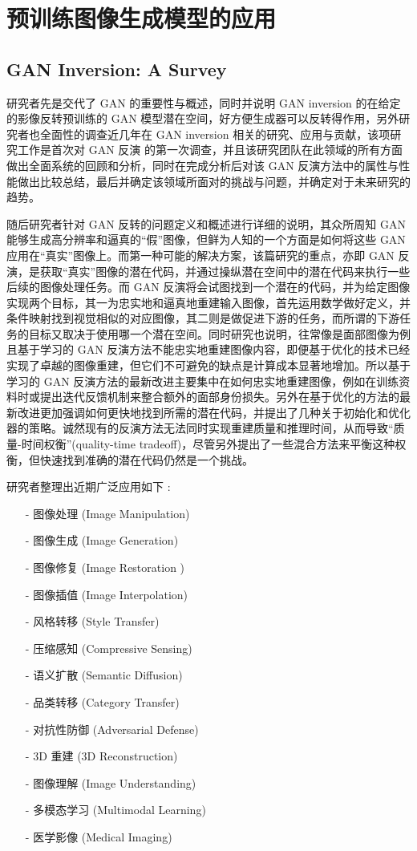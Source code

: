 \section{预训练图像生成模型的应用}

\subsection{GAN Inversion: A Survey}

研究者先是交代了 GAN 的重要性与概述，同时并说明 GAN inversion 的在给定的影像反转预训练的 GAN 模型潜在空间，好方便生成器可以反转得作用，另外研究者也全面性的调查近几年在  GAN inversion  相关的研究、应用与贡献，该项研究工作是首次对 GAN 反演 的第一次调查，并且该研究团队在此领域的所有方面做出全面系统的回顾和分析，同时在完成分析后对该 GAN 反演方法中的属性与性能做出比较总结，最后并确定该领域所面对的挑战与问题，并确定对于未来研究的趋势。

随后研究者针对 GAN 反转的问题定义和概述进行详细的说明，其众所周知 GAN 能够生成高分辨率和逼真的“假”图像，但鲜为人知的一个方面是如何将这些 GAN 应用在“真实”图像上。而第一种可能的解决方案，该篇研究的重点，亦即 GAN 反演，是获取“真实”图像的潜在代码，并通过操纵潜在空间中的潜在代码来执行一些后续的图像处理任务。而 GAN 反演将会试图找到一个潜在的代码，并为给定图像实现两个目标，其一为忠实地和逼真地重建输入图像，首先运用数学做好定义，并条件映射找到视觉相似的对应图像，其二则是做促进下游的任务，而所谓的下游任务的目标又取决于使用哪一个潜在空间。同时研究也说明，往常像是面部图像为例且基于学习的 GAN 反演方法不能忠实地重建图像内容，即便基于优化的技术已经实现了卓越的图像重建，但它们不可避免的缺点是计算成本显著地增加。所以基于学习的 GAN 反演方法的最新改进主要集中在如何忠实地重建图像，例如在训练资料时或提出迭代反馈机制来整合额外的面部身份损失。另外在基于优化的方法的最新改进更加强调如何更快地找到所需的潜在代码，并提出了几种关于初始化和优化器的策略。诚然现有的反演方法无法同时实现重建质量和推理时间，从而导致“质量-时间权衡”(quality-time tradeoff)，尽管另外提出了一些混合方法来平衡这种权衡，但快速找到准确的潜在代码仍然是一个挑战。

研究者整理出近期广泛应用如下 :

\begin{enumerate}
 \item [-] 图像处理 (Image Manipulation)
 \item [-] 图像生成 (Image Generation)
 \item [-] 图像修复 (Image Restoration )
 \item [-] 图像插值 (Image Interpolation)
 \item [-] 风格转移 (Style Transfer)
 \item [-] 压缩感知 (Compressive Sensing)
 \item [-] 语义扩散 (Semantic Diffusion)
 \item [-] 品类转移 (Category Transfer) 
 \item [-] 对抗性防御 (Adversarial Defense)
 \item [-] 3D 重建 (3D Reconstruction)
 \item [-] 图像理解 (Image Understanding)
 \item [-] 多模态学习 (Multimodal Learning)
 \item [-] 医学影像 (Medical Imaging)
\end{enumerate}

